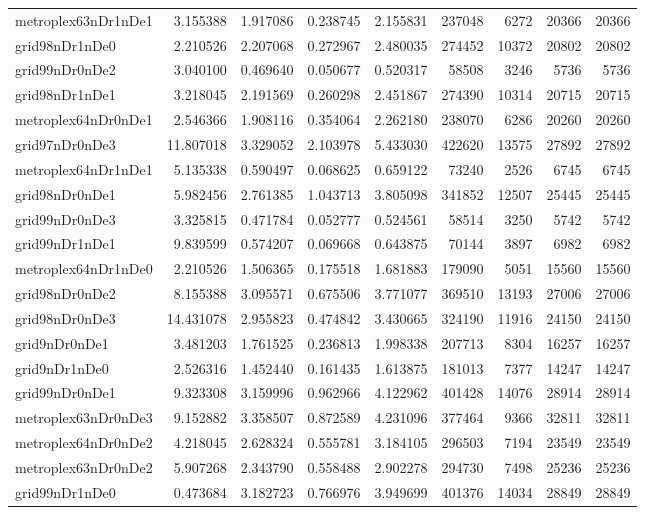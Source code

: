 \documentclass[../../../thesis.tex]{subfiles}
\begin{document}
\begin{longtable}{|l|r|r|r|r|r|r|r|r|}
metroplex63nDr1nDe1 & 3.155388 & 1.917086 & 0.238745 & 2.155831 & 237048 & 6272 & 20366 & 20366 \\
grid98nDr1nDe0 & 2.210526 & 2.207068 & 0.272967 & 2.480035 & 274452 & 10372 & 20802 & 20802 \\
grid99nDr0nDe2 & 3.040100 & 0.469640 & 0.050677 & 0.520317 & 58508 & 3246 & 5736 & 5736 \\
grid98nDr1nDe1 & 3.218045 & 2.191569 & 0.260298 & 2.451867 & 274390 & 10314 & 20715 & 20715 \\
metroplex64nDr0nDe1 & 2.546366 & 1.908116 & 0.354064 & 2.262180 & 238070 & 6286 & 20260 & 20260 \\
grid97nDr0nDe3 & 11.807018 & 3.329052 & 2.103978 & 5.433030 & 422620 & 13575 & 27892 & 27892 \\
metroplex64nDr1nDe1 & 5.135338 & 0.590497 & 0.068625 & 0.659122 & 73240 & 2526 & 6745 & 6745 \\
grid98nDr0nDe1 & 5.982456 & 2.761385 & 1.043713 & 3.805098 & 341852 & 12507 & 25445 & 25445 \\
grid99nDr0nDe3 & 3.325815 & 0.471784 & 0.052777 & 0.524561 & 58514 & 3250 & 5742 & 5742 \\
grid99nDr1nDe1 & 9.839599 & 0.574207 & 0.069668 & 0.643875 & 70144 & 3897 & 6982 & 6982 \\
metroplex64nDr1nDe0 & 2.210526 & 1.506365 & 0.175518 & 1.681883 & 179090 & 5051 & 15560 & 15560 \\
grid98nDr0nDe2 & 8.155388 & 3.095571 & 0.675506 & 3.771077 & 369510 & 13193 & 27006 & 27006 \\
grid98nDr0nDe3 & 14.431078 & 2.955823 & 0.474842 & 3.430665 & 324190 & 11916 & 24150 & 24150 \\
grid9nDr0nDe1 & 3.481203 & 1.761525 & 0.236813 & 1.998338 & 207713 & 8304 & 16257 & 16257 \\
grid9nDr1nDe0 & 2.526316 & 1.452440 & 0.161435 & 1.613875 & 181013 & 7377 & 14247 & 14247 \\
grid99nDr0nDe1 & 9.323308 & 3.159996 & 0.962966 & 4.122962 & 401428 & 14076 & 28914 & 28914 \\
metroplex63nDr0nDe3 & 9.152882 & 3.358507 & 0.872589 & 4.231096 & 377464 & 9366 & 32811 & 32811 \\
metroplex64nDr0nDe2 & 4.218045 & 2.628324 & 0.555781 & 3.184105 & 296503 & 7194 & 23549 & 23549 \\
metroplex63nDr0nDe2 & 5.907268 & 2.343790 & 0.558488 & 2.902278 & 294730 & 7498 & 25236 & 25236 \\
grid99nDr1nDe0 & 0.473684 & 3.182723 & 0.766976 & 3.949699 & 401376 & 14034 & 28849 & 28849 \\

\end{longtable}
\end{document}
